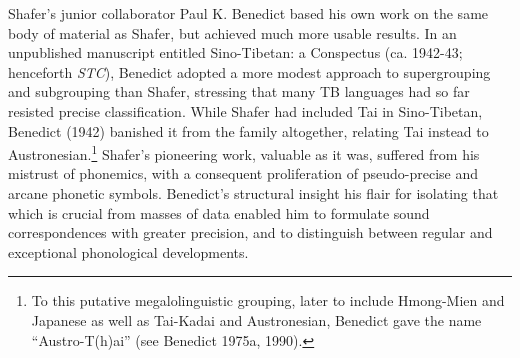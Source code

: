 Shafer’s junior collaborator Paul K. Benedict based his own work on the same body of material as Shafer, but achieved much more usable results. In an unpublished manuscript entitled Sino-Tibetan: a Conspectus (ca. 1942-43; henceforth \textit{STC}), Benedict adopted a more modest approach to supergrouping and subgrouping than Shafer, stressing that many TB languages had so far resisted precise classification. While Shafer had included Tai in Sino-Tibetan, Benedict (1942) banished it from the family altogether, relating Tai instead to Austronesian.\footnote{To this putative megalolinguistic grouping, later to include Hmong-Mien and Japanese as well as Tai-Kadai and Austronesian, Benedict gave the name “Austro-T(h)ai” (see Benedict 1975a, 1990).} Shafer’s pioneering work, valuable as it was, suffered from his mistrust of phonemics, with a consequent proliferation of pseudo-precise and arcane phonetic symbols. Benedict’s structural insight  his flair for isolating that which is crucial from masses of data  enabled him to formulate sound correspondences with greater precision, and to distinguish between regular and exceptional phonological developments.

